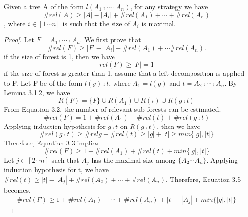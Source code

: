 \begin{lemma}
Given a tree A of the form $l(A_1 \comp \cdots \comp A_n)$, for any strategy we have
\begin{equation*}
\#rel(A) \geq \left\vert A \right\vert - \left\vert A_i \right\vert + \#rel(A_1) + \cdots + \#rel(A_n)
\end{equation*}
, where $i \in [1 \cdots n]$ is such that the size of $A_i$ is maximal.
\end{lemma}

\begin{proof}
Let $F = A_1 \comp \cdots \comp A_n$. We first prove that 
\begin{equation}
\#rel(F) \geq \left\vert F \right\vert - \left\vert A_i \right\vert + \#rel(A_1) + \cdots \#rel(A_n).
\end{equation}
if the size of forest is 1, then we have
\begin{equation*}
rel(F) \geq \left\vert F \right\vert = 1
\end{equation*}
if the size of forest is greater than 1, assume that a left decomposition is applied to F. Let F be of the form $l(g) \comp t$, where $A_1 = l(g)$ and $t = A_2 \comp \cdots \comp A_n$. By Lemma 3.1.2, we have
\begin{equation}
R(F) = \{F\} \cup R(A_1) \cup R(t) \cup R(g \comp t)
\end{equation}
From Equation 3.2, the number of relevant sub-forests can be estimated.
\begin{equation}
\#rel(F) = 1 + \#rel(A_1) + \#rel(t) + \#rel(g \comp t)
\end{equation}
Applying induction hypothesis for $g \comp t$ on $R(g \comp t)$, then we have
\begin{equation}
\#rel(g \comp t) \geq  \#rel{g} + \#rel(t) \geq \left\vert g \right\vert + \left\vert t \right\vert \geq min\{\left\vert g \right\vert , \left\vert t \right\vert\}
\end{equation}
Therefore, Equation 3.3 implies
\begin{equation}
\#rel(F) \geq 1 + \#rel(A_1) + \#rel(t) + min\{\left\vert g \right\vert , \left\vert t \right\vert \}
\end{equation}
Let $j \in [2 \cdots n]$ such that $A_j$ has the maximal size among $\{A_2 \cdots A_n\}$. Applying induction hypothesis for t, we have $\#rel(t) \geq \left\vert t \right\vert - \left\vert A_j \right\vert + \#rel(A_2) + \cdots + \#rel(A_n)$. Therefore, Equation 3.5 becomes,
\begin{equation}
\#rel(F) \geq 1 + \#rel(A_1) + \cdots + \#rel(A_n) + \left\vert t \right\vert -  \left\vert A_j \right\vert + min\{\left\vert g \right\vert , \left\vert t \right\vert \}

\end{equation}
\end{proof}
